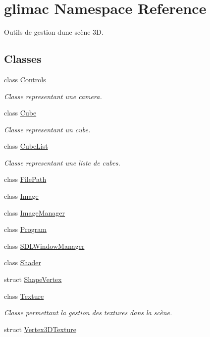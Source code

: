 \hypertarget{namespaceglimac}{}\section{glimac Namespace Reference}
\label{namespaceglimac}


Outils de gestion d\textquotesingle{}une scène 3D.  


\subsection*{Classes}
\begin{DoxyCompactItemize}
\item 
class \hyperlink{classglimac_1_1Controls}{Controls}
\begin{DoxyCompactList}\small\item\em Classe representant une camera. \end{DoxyCompactList}\item 
class \hyperlink{classglimac_1_1Cube}{Cube}
\begin{DoxyCompactList}\small\item\em Classe representant un cube. \end{DoxyCompactList}\item 
class \hyperlink{classglimac_1_1CubeList}{Cube\+List}
\begin{DoxyCompactList}\small\item\em Classe representant une liste de cubes. \end{DoxyCompactList}\item 
class \hyperlink{classglimac_1_1FilePath}{File\+Path}
\item 
class \hyperlink{classglimac_1_1Image}{Image}
\item 
class \hyperlink{classglimac_1_1ImageManager}{Image\+Manager}
\item 
class \hyperlink{classglimac_1_1Program}{Program}
\item 
class \hyperlink{classglimac_1_1SDLWindowManager}{S\+D\+L\+Window\+Manager}
\item 
class \hyperlink{classglimac_1_1Shader}{Shader}
\item 
struct \hyperlink{structglimac_1_1ShapeVertex}{Shape\+Vertex}
\item 
class \hyperlink{classglimac_1_1Texture}{Texture}
\begin{DoxyCompactList}\small\item\em Classe permettant la gestion des textures dans la scène. \end{DoxyCompactList}\item 
struct \hyperlink{structglimac_1_1Vertex3DTexture}{Vertex3\+D\+Texture}
\end{DoxyCompactItemize}
